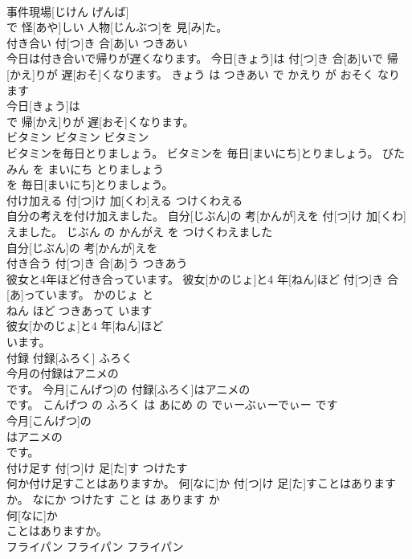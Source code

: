 \documentclass[8pt]{extreport}
\begin{document}
\begin{CJK}{UTF8}{min}
\\	事件現場[じけん げんば]
\\	で 怪[あや]しい 人物[じんぶつ]を 見[み]た。			
\\	付き合い	付[つ]き 合[あ]い	つきあい	
\\	今日は付き合いで帰りが遅くなります。	今日[きょう]は 付[つ]き 合[あ]いで 帰[かえ]りが 遅[おそ]くなります。	きょう は つきあい で かえり が おそく なります	
\\	今日[きょう]は
\\	で 帰[かえ]りが 遅[おそ]くなります。			
\\	ビタミン	ビタミン	ビタミン	
\\	ビタミンを毎日とりましょう。	ビタミンを 毎日[まいにち]とりましょう。	びたみん を まいにち とりましょう	
\\	を 毎日[まいにち]とりましょう。			
\\	付け加える	付[つ]け 加[くわ]える	つけくわえる	
\\	自分の考えを付け加えました。	自分[じぶん]の 考[かんが]えを 付[つ]け 加[くわ]えました。	じぶん の かんがえ を つけくわえました	
\\	自分[じぶん]の 考[かんが]えを
\\	付き合う	付[つ]き 合[あ]う	つきあう	
\\	彼女と4年ほど付き合っています。	彼女[かのじょ]と4 年[ねん]ほど 付[つ]き 合[あ]っています。	かのじょ と 
\\	ねん ほど つきあって います	
\\	彼女[かのじょ]と4 年[ねん]ほど
\\	います。			
\\	付録	付録[ふろく]	ふろく	
\\	今月の付録はアニメの
\\	です。	今月[こんげつ]の 付録[ふろく]はアニメの 
\\	[でぃーぶぃーでぃー]です。	こんげつ の ふろく は あにめ の でぃーぶぃーでぃー です	
\\	今月[こんげつ]の
\\	はアニメの 
\\	[でぃーぶぃーでぃー]です。			
\\	付け足す	付[つ]け 足[た]す	つけたす	
\\	何か付け足すことはありますか。	何[なに]か 付[つ]け 足[た]すことはありますか。	なにか つけたす こと は あります か	
\\	何[なに]か
\\	ことはありますか。			
\\	フライパン	フライパン	フライパン	

\end{CJK}
\end{document}
